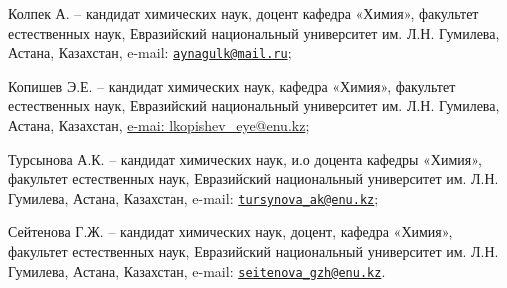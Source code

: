 \begin{authorinfo}
Колпек А. -- кандидат химических наук, доцент кафедра «Химия», факультет
естественных наук, Евразийский национальный университет им. Л.Н.
Гумилева, Астана, Казахстан, e-mail:
\href{mailto:aynagulk@mail.ru}{\nolinkurl{aynagulk@mail.ru}};

Копишев Э.Е. -- кандидат химических наук, кафедра «Химия», факультет
естественных наук, Евразийский национальный университет им. Л.Н.
Гумилева, Астана, Казахстан,
\href{mailto:e-mai:\%20lkopishev_eye@enu.kz}{e-mai:
lkopishev\_eye@enu.kz};

Турсынова А.К. -- кандидат химических наук, и.о доцента кафедры «Химия»,
факультет естественных наук, Евразийский национальный университет им.
Л.Н. Гумилева, Астана, Казахстан, e-mail:
\href{mailto:tursynova_ak@enu.kz}{\nolinkurl{tursynova\_ak@enu.kz}};

Сейтенова Г.Ж. -- кандидат химических наук, доцент, кафедра «Химия»,
факультет естественных наук, Евразийский национальный университет им.
Л.Н. Гумилева, Астана, Казахстан, e-mail:
\href{mailto:seitenova_gzh@enu.kz}{\nolinkurl{seitenova\_gzh@enu.kz}}.
\end{authorinfo}
